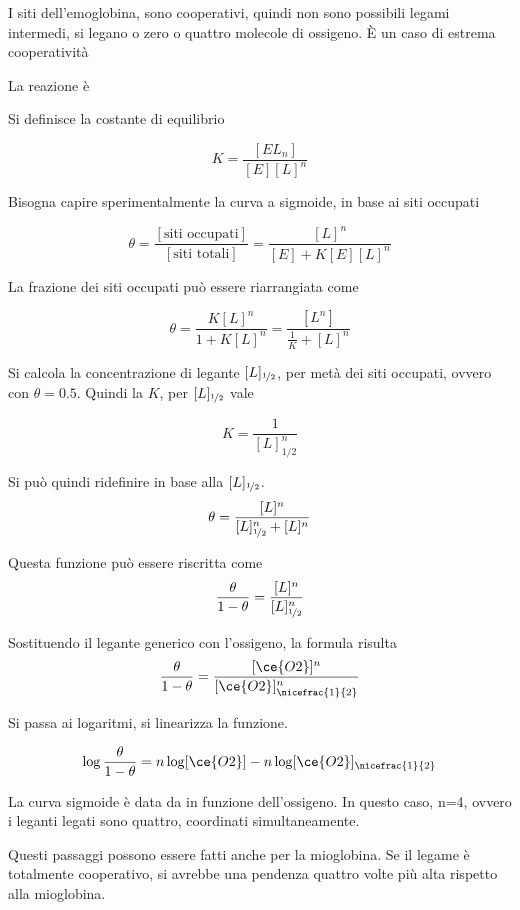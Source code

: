 I siti dell'emoglobina, sono cooperativi, quindi non sono possibili
legami intermedi, si legano o zero o quattro molecole di ossigeno. È un
caso di estrema cooperatività

La reazione è

\begin{center}
\end{center}

Si definisce la costante di equilibrio

\[
K = \frac{[EL_n]}{[E][L]^n}
\]

Bisogna capire sperimentalmente la curva a sigmoide, in base ai siti
occupati

\[
\theta = \frac{[\text{siti occupati}]}{[\text{siti totali}]} = \frac{[L]^n}{[E] + K[E][L]^n}
\]

La frazione dei siti occupati può essere riarrangiata come

\[
\theta =\frac{K[L]^n}{1 + K[L]^n} =\frac{[L^n]}{\frac{1}{K} + [L]^n}
\]

Si calcola la concentrazione di legante \([L]_{\nicefrac{1}{2}}\), per
metà dei siti occupati, ovvero con \(\theta = 0.5\). Quindi la \(K\),
per \([L]_{\nicefrac{1}{2}}\) vale

\[
K = \frac{1}{[L]^n_{1/2}}
\]

Si può quindi ridefinire \theta{} in base alla \([L]_{\nicefrac{1}{2}}\).
\[
\theta = \frac{[L]^n}{[L]^n_{\nicefrac{1}{2}} + [L]^n}
\]

Questa funzione può essere riscritta come
\[
\frac{\theta}{1 - \theta} = \frac{[L]^n}{[L]^n_{\nicefrac{1}{2}}}
\]

Sostituendo il legante generico con l'ossigeno, la formula risulta
\[
\frac{\theta}{1 - \theta} = \frac{[\ce{O2}]^n}{[\ce{O2}]^n_{\nicefrac{1}{2}}}
\]

Si passa ai logaritmi, si linearizza la funzione.

\[
\log \frac{\theta}{1-\theta} = n\log [\ce{O2}] - n\log[\ce{O2}]_{\nicefrac{1}{2}}
\]

La curva sigmoide è data da \theta{} in funzione dell'ossigeno. In questo
caso, n=4, ovvero i leganti legati sono quattro, coordinati
simultaneamente.


Questi passaggi possono essere fatti anche per la mioglobina. Se il
legame è totalmente cooperativo, si avrebbe una pendenza quattro volte
più alta rispetto alla mioglobina.

